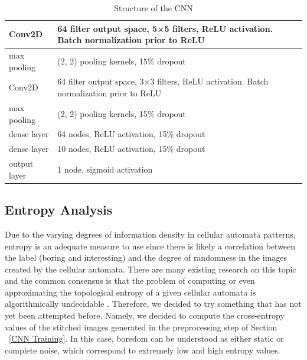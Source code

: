 \documentclass[12pt]{article}
\numberwithin{figure}{section} %
\begin{document}
\begin{table}[H]
	\begin{center}
		\begin{tabular}{ | m{2cm} | m{8cm} | } 
			\hline
			Conv2D & 64 filter output space, 5×5 filters, ReLU activation. Batch normalization prior to ReLU \\ 
			\hline
			max pooling & (2, 2) pooling kernels, 15\% dropout  \\ 
			\hline
			Conv2D & 64 filter output space, 3×3 filters, ReLU activation. Batch normalization prior to ReLU  \\ 
			\hline
			max pooling & (2, 2) pooling kernels, 15\% dropout \\ 
			\hline
			dense layer & 64 nodes, ReLU activation, 15\% dropout  \\ 
			\hline
			dense layer & 10 nodes, ReLU activation, 15\% dropout  \\ 
			\hline
			output layer & 1 node, sigmoid activation \\
			\hline
		\end{tabular}
	\caption{Structure of the CNN}
	\label{table:CNN structure}
	\vspace{-1.5em}
	\end{center}
\end{table}

\subsection{Entropy Analysis}
Due to the varying degrees of information density in cellular automata patterns, entropy is an adequate measure to use since there is likely a correlation between the label (boring and interesting) and the degree of randomness in the images created by the cellular automata. There are many existing research on this topic and the common consensus is that the problem of computing or even approximating the topological entropy of a given cellular automata is algorithmically undecidable \cite{entropy, entropy-two}. Therefore, we decided to try something that has not yet been attempted before. Namely, we decided to compute the cross-entropy values of the stitched images generated in the preprocessing step of Section ~\ref{CNN Training}. In this case, boredom can be understood as either static or complete noise, which correspond to extremely low and high entropy values. 
\end{document}
